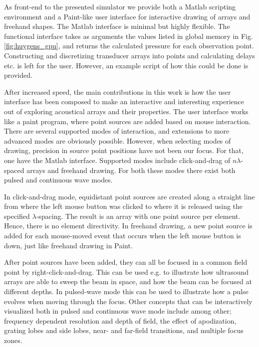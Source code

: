 As front-end to the presented simulator we provide both a Matlab scripting environment and a Paint-like user interface for interactive drawing of arrays and freehand shapes. The Matlab interface is minimal but highly flexible. The functional interface takes as arguments the values listed in global memory in Fig. \ref{fig:huygens_gpu}, and returns the calculated pressure for each observation point. Constructing and discretizing transducer arrays into points and calculating delays etc. is left for the user. However, an example script of how this could be done is provided. 

After increased speed, the main contributions in this work is how the user interface has been composed to make an interactive and interesting experience out of exploring acoustical arrays and their properties. The user interface works like a paint program, where point sources are added based on mouse interaction. There are several supported modes of interaction, and extensions to more advanced modes are obviously possible. However, when selecting modes of drawing, precision in source point positions have not been our focus. For that, one have the Matlab interface.  Supported modes include click-and-drag of $n\lambda$-spaced arrays and freehand drawing. For both these modes there exist both pulsed and continuous wave modes. 

In click-and-drag mode, equidistant point sources are created along a straight line from where the left mouse button was clicked to where it is released using the specified $\lambda$-spacing. The result is an array with one point source per element. Hence, there is no element directivity. In freehand drawing, a new point source is added for each mouse-moved event that occurs when the left mouse button is down, just like freehand drawing in Paint. 

After point sources have been added, they can all be focused in a common field point by right-click-and-drag. This can be used e.g. to illustrate how ultrasound arrays are able to sweep the beam in space, and how the beam can be focused at different depths. In pulsed-wave mode this can be used to illustrate how a pulse evolves when moving through the focus. Other concepts that can be interactively visualized both in pulsed and continuous wave mode include among other; frequency dependent resolution and depth of field, the effect of apodization, grating lobes and side lobes, near- and far-field transitions, and multiple focus zones.      


